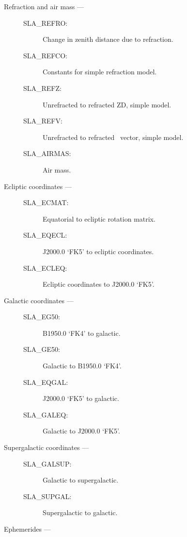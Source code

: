 \begin{description}
\item [Refraction and air mass ---]

\begin{description}
\item [SLA\_REFRO:]  Change in zenith distance due to refraction.
\item [SLA\_REFCO:]  Constants for simple refraction model.
\item [SLA\_REFZ:]  Unrefracted to refracted ZD, simple model.
\item [SLA\_REFV:]  Unrefracted to refracted \azel\ vector, simple model.
\item [SLA\_AIRMAS:]  Air mass.
\end{description}

\item [Ecliptic coordinates ---]

\begin{description}
\item [SLA\_ECMAT:]  Equatorial to ecliptic rotation matrix.
\item [SLA\_EQECL:]  J2000.0 `FK5' to ecliptic coordinates.
\item [SLA\_ECLEQ:]  Ecliptic coordinates to J2000.0 `FK5'.
\end{description}

\item [Galactic coordinates ---]

\begin{description}
\item [SLA\_EG50:]  B1950.0 `FK4' to galactic.
\item [SLA\_GE50:]  Galactic to B1950.0 `FK4'.
\item [SLA\_EQGAL:]  J2000.0 `FK5' to galactic.
\item [SLA\_GALEQ:]  Galactic to J2000.0 `FK5'.
\end{description}

\item [Supergalactic coordinates ---]

\begin{description}
\item [SLA\_GALSUP:]  Galactic to supergalactic.
\item [SLA\_SUPGAL:]  Supergalactic to galactic.
\end{description}

\item [Ephemerides ---]


\end{description}
